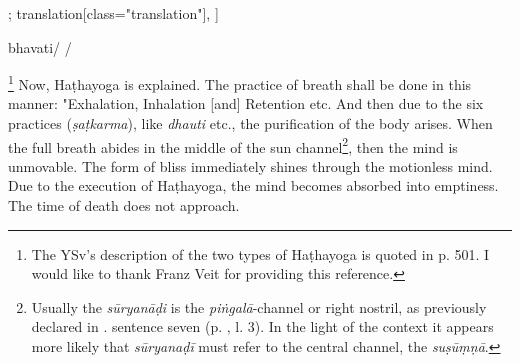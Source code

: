 \begin{alignment}[
  texts=edition[class="edition"];
  translation[class="translation"],
  ]
\begin{edition}
\begin{prose}[p20_01]
bhavati/
/
\dd{}
\end{prose}
  \end{edition}
  \begin{translation}
\label{hathayogatrans}
      \begin{tlate}[p19_01]
        \noindent
        \footnote{The YSv's description of the two types of Haṭhayoga is quoted in  p. 501. I would like to thank Franz Veit for providing this reference.} Now, Haṭhayoga is explained. The practice of breath shall be done in this manner: "Exhalation, Inhalation [and] Retention etc. And then due to the six practices (\textit{ṣaṭkarma}), like \textit{dhauti} etc., the purification of the body arises. When the full breath abides in the middle of the sun channel\footnote{Usually the \textit{sūryanāḍi} is the \textit{piṅgalā}-channel or right nostril, as previously declared in . sentence seven (p. \pageref{siddhayoga}, l. 3). In the light of the context it appears more likely that \textit{sūryanaḍī} must refer to the central channel, the \textit{suṣūṃṇā}.}, then the mind is unmovable. The form of bliss immediately shines through the motionless mind. Due to the execution of Haṭhayoga, the mind becomes absorbed into emptiness. The time of death does not approach.
      \end{tlate}

\end{translation}
\end{alignment}
